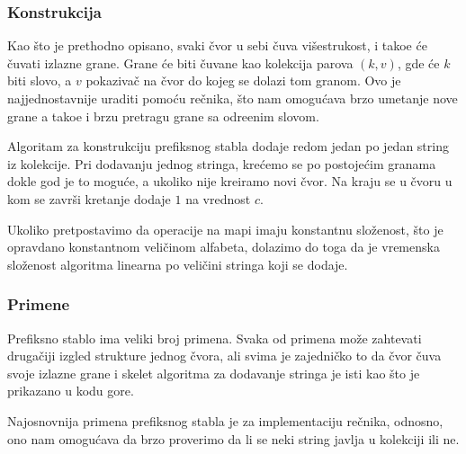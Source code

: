 \subsubsection{Konstrukcija}

Kao \v sto je prethodno opisano, svaki \v cvor u sebi \v cuva vi\v sestrukost, i tako\dj e \' ce \v cuvati izlazne grane. Grane \' ce biti \v cuvane kao kolekcija parova $(k, v)$, gde \' ce $k$ biti slovo, a $v$ pokaziva\v c na \v cvor do kojeg se dolazi tom granom. Ovo je najjednostavnije uraditi pomo\' cu re\v cnika, \v sto nam omogu\'cava brzo umetanje nove grane a tako\dj e i brzu pretragu grane sa odre\dj enim slovom.



Algoritam za konstrukciju prefiksnog stabla dodaje redom jedan po jedan string iz kolekcije. Pri dodavanju jednog stringa, kre\' cemo se po postoje\' cim granama dokle god je to mogu\' ce, a ukoliko nije kreiramo novi \v cvor. Na kraju se u \v cvoru u kom se zavr\v si kretanje dodaje $1$ na vrednost $c$.



Ukoliko pretpostavimo da operacije na mapi imaju konstantnu slo\v zenost, \v sto je opravdano konstantnom veli\v cinom alfabeta, dolazimo do toga da je vremenska slo\v zenost algoritma linearna po veli\v cini stringa koji se dodaje.

\subsubsection{Primene}

Prefiksno stablo ima veliki broj primena. Svaka od primena mo\v ze zahtevati druga\v ciji izgled strukture jednog \v cvora, ali svima je zajedni\v cko to da \v cvor \v cuva svoje izlazne grane i skelet algoritma za dodavanje stringa je isti kao \v sto je prikazano u kodu gore.

Najosnovnija primena prefiksnog stabla je za implementaciju re\v cnika, odnosno, ono nam omogu\' cava da brzo proverimo da li se neki string javlja u kolekciji ili ne.



